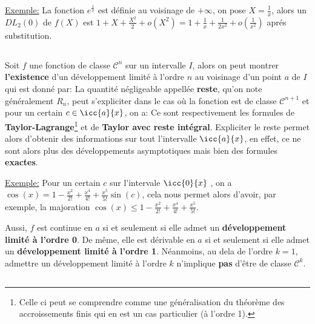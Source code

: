 \underline{Exemple:} La fonction \(e^\frac{1}{x}\) est définie au voisinage de \(+ \infty\), on pose \(X = \frac{1}{x}\), alors un \(DL_2(0)\) de \(f(X)\) est \(1 + X + \frac{X^2}{2}+o(X^2) = 1 + \frac{1}{x} + \frac{1}{2x^2} + o(\frac{1}{x^2})\) aprés substitution.
\pagebreak

\subsection*{}
Soit \(f\) une fonction de classe \(\mathscr{C}^n\) sur un intervalle \(I\), alors on peut montrer \textbf{l'existence} d'un développement limité à l'ordre \(n\) au voisinage d'un point \(a\) de \(I\) qui est donné par:
La quantité négligeable appellée \textbf{reste}, qu'on note généralement \(R_n\), peut s'expliciter dans le cas où la fonction est de classe \(\mathscr{C}^{n+1}\) et pour un certain \(c \in \icc{a}{x}\), on a:
Ce sont respectivement les formules de \textbf{Taylor-Lagrange}\footnote[1]{Celle ci peut se comprendre comme une généralisation du théorème des accroissements finis qui en est un cas particulier (à l'ordre 1).} et de \textbf{Taylor avec reste intégral}.\+
Expliciter le reste permet alors d'obtenir des informations sur tout l'intervalle \(\icc{a}{x}\), en effet, ce ne sont alors plus des développements asymptotiques mais bien des formules \textbf{exactes}.\<

\underline{Exemple:} Pour un certain \(c\) sur l'intervale \(\icc{0}{x}\) , on a \(\cos(x) = 1 - \frac{x^2}{2!} + \frac{x^4}{4!} + \frac{x^5}{5!}\sin(c)\), cela nous permet alors d'avoir, par exemple, la majoration \(\cos(x) \leq 1 - \frac{x^2}{2!} + \frac{x^4}{4!} + \frac{x^5}{5!}\).
\<


Aussi, \(f\) est continue en \(a\) si et seulement si elle admet un \textbf{développement limité à l'ordre 0}.\+
De même, elle est dérivable en \(a\) si et seulement si elle admet un \textbf{développement limité à l'ordre 1}.\+
Néanmoins, au dela de l'ordre \(k = 1\), admettre un développement limité à l'ordre \(k\) n'implique \textbf{pas} d'être de classe \(\mathscr{C}^k\).

\subsection*{}

